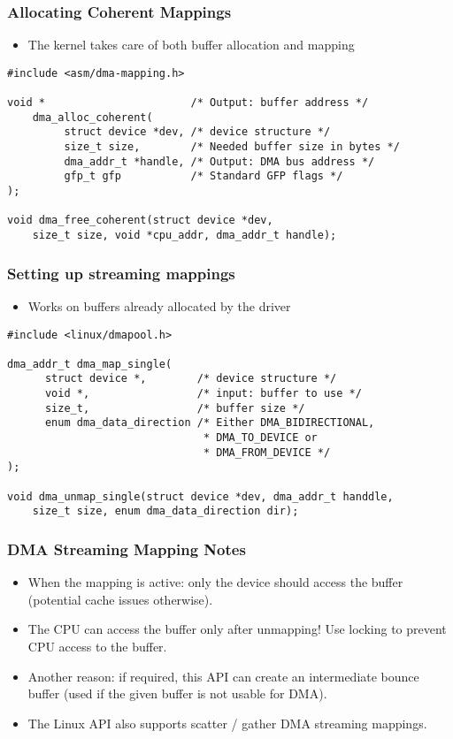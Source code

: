 \begin{frame}[fragile]
  \frametitle{Allocating Coherent Mappings}
  \begin{itemize}
  \item The kernel takes care of both buffer allocation and mapping
  \end{itemize}
\begin{verbatim}
#include <asm/dma-mapping.h>

void *                       /* Output: buffer address */
    dma_alloc_coherent(
         struct device *dev, /* device structure */
         size_t size,        /* Needed buffer size in bytes */
         dma_addr_t *handle, /* Output: DMA bus address */
         gfp_t gfp           /* Standard GFP flags */
);

void dma_free_coherent(struct device *dev,
    size_t size, void *cpu_addr, dma_addr_t handle);
\end{verbatim}
\end{frame}

\begin{frame}[fragile]
  \frametitle{Setting up streaming mappings}
  \begin{itemize}
  \item Works on buffers already allocated by the driver
  \end{itemize}
\begin{verbatim}
#include <linux/dmapool.h>

dma_addr_t dma_map_single(
      struct device *,        /* device structure */
      void *,                 /* input: buffer to use */
      size_t,                 /* buffer size */
      enum dma_data_direction /* Either DMA_BIDIRECTIONAL,
                               * DMA_TO_DEVICE or
                               * DMA_FROM_DEVICE */
);

void dma_unmap_single(struct device *dev, dma_addr_t handdle,
    size_t size, enum dma_data_direction dir);
\end{verbatim}
\end{frame}

\begin{frame}
  \frametitle{DMA Streaming Mapping Notes}
  \begin{itemize}
  \item When the mapping is active: only the device should access the
    buffer (potential cache issues otherwise).
  \item The CPU can access the buffer only after unmapping! Use
    locking to prevent CPU access to the buffer.
  \item Another reason: if required, this API can create an
    intermediate bounce buffer (used if the given buffer is not usable
    for DMA).
  \item The Linux API also supports scatter / gather DMA streaming
    mappings.
  \end{itemize}
\end{frame}


